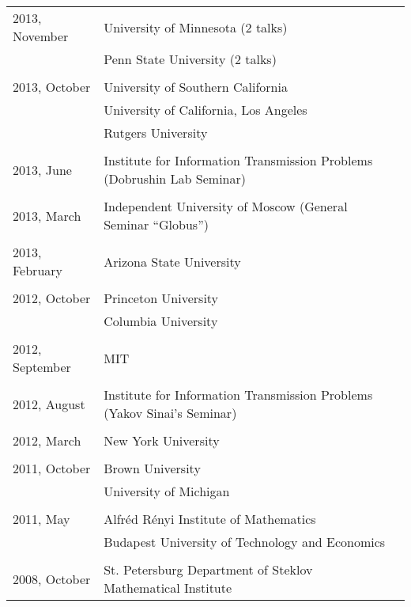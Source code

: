 \documentclass[letterpaper,11pt]{article}
\begin{document}
\begin{longtable}{llc}
  2013, November&
  University of Minnesota (2 talks)\\&
  Penn State University (2 talks)\\\\

  2013, October&
  University of Southern California 
  \\&
  University of California, Los Angeles
  \\&Rutgers University\\\\
  
  2013, June& Institute for Information Transmission Problems
  (Dobrushin Lab Seminar)\\\\

  2013, March& Independent University of Moscow (General Seminar ``Globus'')\\\\

  2013, February & Arizona State University\\\\

  2012, October & Princeton University \\
  & Columbia University\\\\

  2012, September & MIT \\\\ 

  2012, August
  & Institute for Information Transmission Problems
  (Yakov Sinai's Seminar)
  \\\\ 

  2012, March & New York University\\\\

  2011, October & Brown University \\
  &University of Michigan
  \\
  \\
  2011, May& Alfr\'ed R\'enyi Institute of Mathematics
  \\
  & Budapest University of Technology and Economics
  \\\\

  2008, October & 
  St. Petersburg Department of Steklov Mathematical Institute%
  \\
\end{longtable}
\bigskip
\end{document}
